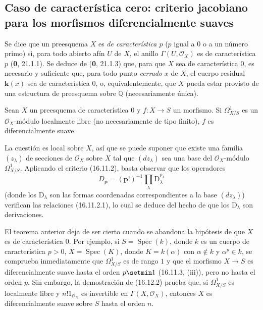 \subsection{Caso de característica cero: criterio jacobiano para los
morfismos diferencialmente suaves}
\label{IV.16.12}

\begin{env}[16.12.1]
\label{IV.16.12.1}
Se dice que un preesquema $X$ es \emph{de característica $p$} ($p$ igual a $0$
o a un número primo) si, para todo abierto afín $U$ de $X$, el anillo
$\Gamma(U,\mathcal{O}_X)$ es de característica $p$ (\textbf 0, 21.1.1). Se deduce
de (\textbf 0, 21.1.3) que, para que $X$ sea de característica $0$, es necesario y
suficiente que, para todo punto \emph{cerrado} $x$ de $X$, el cuerpo residual
$\boldsymbol{k}(x)$ sea de característica $0$, o, equivalentemente, que $X$ pueda estar
provisto de una estructura de preesquema sobre $\mathbb{Q}$ (necesariamente
única).
\end{env}

\begin{theorem}[16.12.2]
\label{IV.16.12.2}
Sean $X$ un preesquema de característica $0$ y $f:X\to S$ un morfismo. Si
$\varOmega_{X/S}^1$ es un $\mathcal{O}_X$-módulo localmente libre (no
necesariamente de tipo finito), $f$ es diferencialmente suave.
\end{theorem}

La cuestión es local sobre $X$, así que se puede suponer que existe una familia
$(z_\lambda)$ de secciones de $\mathcal{O}_X$ sobre $X$ tal que $(dz_\lambda)$
sea una base del $\mathcal{O}_X$-módulo $\varOmega_{X/S}^1$. Aplicando el criterio
(16.11.2), basta observar que los operadores
\[
  D_{\mathbf{p}}=(\mathbf{p}!)^{-1}
  \prod_\lambda \mathrm{D}_\lambda^{p_\lambda}
\]
(donde los $\mathrm{D}_\lambda$ son las formas coordenadas correspondientes a la base
$(dz_\lambda)$) verifican las relaciones (16.11.2.1), lo cual se deduce del
hecho de que los $\mathrm{D}_\lambda$ son derivaciones.

\begin{env}[16.12.3]
\label{IV.16.12.3}
El teorema anterior deja de ser cierto cuando se abandona la hipótesis de que
$X$ es de característica $0$. Por ejemplo, si
$S=\operatorname{Spec}(k)$, donde $k$ es un cuerpo de característica $p>0$,
$X=\operatorname{Spec}(K)$, donde $K=k(\alpha)$ con
$\alpha\notin k$ y $\alpha^p\in k$, se comprueba inmediatamente
que $\varOmega_{X/S}^1$ es de rango $1$ y que el morfismo $X\to S$ es
diferencialmente suave hasta el orden $p\setmin 1$ (16.11.3, (iii)), pero no hasta
el orden $p$. Sin embargo, la demostración de (16.12.2) prueba que, si
$\varOmega_{X/S}^1$ es localmente libre y $n!1_{\mathcal{O}_X}$ es invertible en
$\Gamma(X,\mathcal{O}_X)$, entonces $X$ es diferencialmente suave sobre $S$
hasta el orden $n$.
\end{env}

